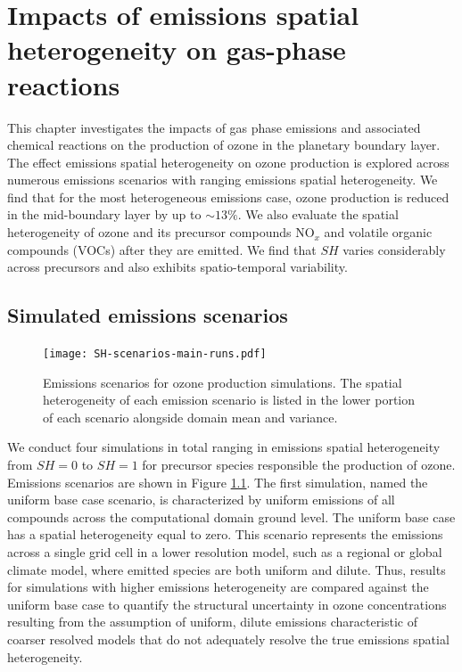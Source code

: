 \chapter{Impacts of emissions spatial heterogeneity on gas-phase reactions}

This chapter investigates the impacts of gas phase emissions and associated chemical reactions on the production of ozone in the planetary boundary layer. The effect emissions spatial heterogeneity on ozone production is explored across numerous emissions scenarios with ranging emissions spatial heterogeneity. We find that for the most heterogeneous emissions case, ozone production is reduced in the mid-boundary layer by up to $\sim13\%$. We also evaluate the spatial heterogeneity of ozone and its precursor compounds NO$_x$ and volatile organic compounds (VOCs) after they are emitted. We find that $SH$ varies considerably across precursors and also exhibits spatio-temporal variability.

\section{Simulated emissions scenarios}\label{gas-emission-scenarios}

\begin{figure}[h]
	\centering
	\texttt{[image: SH-scenarios-main-runs.pdf]}
	\caption{Emissions scenarios for ozone production simulations. The spatial heterogeneity of each emission scenario is listed in the lower portion of each scenario alongside domain mean and variance.}
	\label{fig:ozone-emission-patterns}
\end{figure}

We conduct four simulations in total ranging in emissions spatial heterogeneity from $SH=0$ to $SH=1$ for precursor species responsible the production of ozone. Emissions scenarios are shown in Figure \ref{fig:ozone-emission-patterns}. The first simulation, named the uniform base case scenario, is characterized by uniform emissions of all compounds across the computational domain ground level. The uniform base case has a spatial heterogeneity equal to zero. This scenario represents the emissions across a single grid cell in a lower resolution model, such as a regional or global climate model, where emitted species are both uniform and dilute. Thus, results for simulations with higher emissions heterogeneity are compared against the uniform base case to quantify the structural uncertainty in ozone concentrations resulting from the assumption of uniform, dilute emissions characteristic of coarser resolved models that do not adequately resolve the true emissions spatial heterogeneity.  

